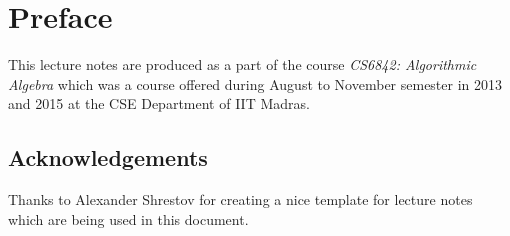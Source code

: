 \chapter*{Preface}

This lecture notes are produced as a part of the course \textit{CS6842: Algorithmic Algebra} which was a course offered during August to November semester in 2013 and 2015 at the CSE Department of IIT Madras.

\section*{Acknowledgements}
Thanks to Alexander Shrestov for creating a nice template for lecture notes which are being used in this document.
